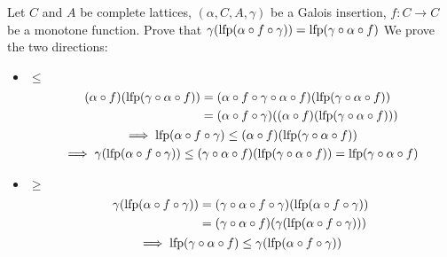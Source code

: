 \begin{exercise}{
    Let $C$ and $A$ be complete lattices, $(\alpha, C, A, \gamma)$ be a Galois insertion, $f: C \to C$ be a monotone function. Prove that $\gamma(\operatorname{lfp}(\alpha \circ f \circ \gamma)) = \operatorname{lfp}(\gamma \circ \alpha \circ f)$
}
    We prove the two directions:
    \begin{itemize}
        \item $\leq$
        \begin{gather*}
            \begin{aligned}
                (\alpha \circ f)(\operatorname{lfp}(\gamma \circ \alpha \circ f))
                &= (\alpha \circ f \circ \gamma \circ \alpha \circ f)(\operatorname{lfp}(\gamma \circ \alpha \circ f)) \\
                &= (\alpha \circ f \circ \gamma)((\alpha \circ f)(\operatorname{lfp}(\gamma \circ \alpha \circ f)))
            \end{aligned} \\
            \implies \operatorname{lfp}(\alpha \circ f \circ \gamma) \leq (\alpha \circ f)(\operatorname{lfp}(\gamma \circ \alpha \circ f)) \\
            \implies \gamma(\operatorname{lfp}(\alpha \circ f \circ \gamma)) \leq (\gamma \circ \alpha \circ f)(\operatorname{lfp}(\gamma \circ \alpha \circ f)) = \operatorname{lfp}(\gamma \circ \alpha \circ f)
        \end{gather*}
        \item $\geq$
        \begin{gather*}
            \begin{aligned}
                \gamma(\operatorname{lfp}(\alpha \circ f \circ \gamma))
                &= (\gamma \circ \alpha \circ f \circ \gamma) (\operatorname{lfp}(\alpha \circ f \circ \gamma)) \\
                &= (\gamma \circ \alpha \circ f)(\gamma(\operatorname{lfp}(\alpha \circ f \circ \gamma)))
            \end{aligned} \\
            \implies \operatorname{lfp}(\gamma \circ \alpha \circ f) \leq \gamma(\operatorname{lfp}(\alpha \circ f \circ \gamma))
        \end{gather*}
    \end{itemize}
\end{exercise}
